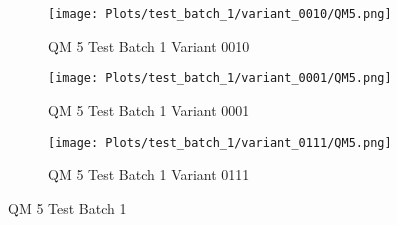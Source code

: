 \documentclass{DissertateFigs}
\begin{document}
\begin{figure}[t!]
\medskip

    \begin{subfigure}{0.47\textwidth}
    \texttt{[image: Plots/test\_batch\_1/variant\_0010/QM5.png]}
    \caption{QM 5 Test Batch 1 Variant 0010}
    \end{subfigure}
    \begin{subfigure}{0.47\textwidth}
    \texttt{[image: Plots/test\_batch\_1/variant\_0001/QM5.png]}
    \caption{QM 5 Test Batch 1 Variant 0001}
    \end{subfigure}

\medskip

    \begin{subfigure}{0.47\textwidth}
    \texttt{[image: Plots/test\_batch\_1/variant\_0111/QM5.png]}
    \caption{QM 5 Test Batch 1 Variant 0111}
    \end{subfigure}
\caption{QM 5 Test Batch 1}
    \end{figure}
\clearpage
\end{document}
